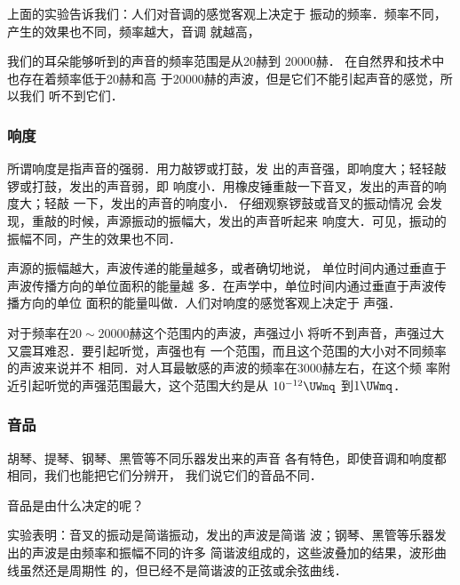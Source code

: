 上面的实验告诉我们：人们对音调的感觉客观上决定于
振动的频率．频率不同，产生的效果也不同，频率越大，音调
就越高，

我们的耳朵能够听到的声音的频率范围是从20赫到
20000赫．
在自然界和技术中也存在着频率低于20赫和高
于20000赫的声波，但是它们不能引起声音的感觉，所以我们
听不到它们．


\subsubsection{响度}
所谓响度是指声音的强弱．用力敲锣或打鼓，发
出的声音强，即响度大；轻轻敲锣或打鼓，发出的声音弱，即
响度小．用橡皮锤重敲一下音叉，发出的声音的响度大；轻敲
一下，发出的声音的响度小．
仔细观察锣鼓或音叉的振动情况
会发现，重敲的时候，声源振动的振幅大，发出的声音听起来
响度大．可见，振动的振幅不同，产生的效果也不同．

声源的振幅越大，声波传递的能量越多，或者确切地说，
单位时间内通过垂直于声波传播方向的单位面积的能量越
多．在声学中，单位时间内通过垂直于声波传播方向的单位
面积的能量叫做．人们对响度的感觉客观上决定于
声强．

对于频率在$20 \sim 20000$赫这个范围内的声波，声强过小
将听不到声音，声强过大又震耳难忍．要引起听觉，声强也有
一个范围，而且这个范围的大小对不同频率的声波来说并不
相同．对人耳最敏感的声波的频率在3000赫左右，在这个频
率附近引起听觉的声强范围最大，这个范围大约是从
$10^{-12} \UWmq $
到$1 \UWmq$．

\subsubsection{音品}

胡琴、提琴、钢琴、黑管等不同乐器发出来的声音
各有特色，即使音调和响度都相同，我们也能把它们分辨开，
我们说它们的音品不同．

音品是由什么决定的呢？

实验表明：音叉的振动是简谐振动，发出的声波是简谐
波；钢琴、黑管等乐器发出的声波是由频率和振幅不同的许多
简谐波组成的，这些波叠加的结果，波形曲线虽然还是周期性
的，但已经不是简谐波的正弦或余弦曲线．

